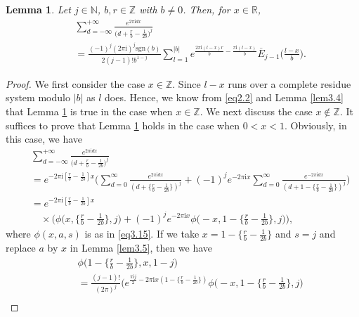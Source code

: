\documentclass[10pt,a4paper]{amsart}
\newtheorem{lemma}{Lemma}
\begin{document}
\begin{lemma}\label{lem3.6} Let $j\in\mathbb{N}$, $b,r\in\mathbb{Z}$ with $b\not=0$. Then, for $x\in\mathbb{R}$,
\begin{eqnarray}\label{eq3.16}
&&\sum_{d=-\infty}^{+\infty}\frac{e^{2\pi \mathrm{i}dx}}{\bigl(d+\frac{r}{b}-\frac{1}{2b}\bigl)^{j}}\nonumber\\
&&=\frac{(-1)^{j}(2\pi\mathrm{i})^{j}\mathrm{sgn}(b)}{2(j-1)!b^{1-j}}\sum_{l=1}^{|b|}e^{\frac{2\pi \mathrm{i}(l-x)r}{b}-\frac{\pi \mathrm{i}(l-x)}{b}}\overline{E}_{j-1}\biggl(\frac{l-x}{b}\biggl).
\end{eqnarray}
\end{lemma}

\begin{proof}
We first consider the case $x\in\mathbb{Z}$.
Since $l-x$ runs over a complete residue system modulo $|b|$ as
$l$ does. Hence, we know from \eqref{eq2.2} and Lemma \ref{lem3.4} that Lemma \ref{lem3.6} is true in the case when $x\in\mathbb{Z}$. We next discuss the case $x\not\in\mathbb{Z}$. It suffices to prove that Lemma \ref{lem3.6} holds in the case when $0<x<1$. Obviously, in this case, we have
\begin{eqnarray}\label{eq3.17}
&&\sum_{d=-\infty}^{+\infty}\frac{e^{2\pi \mathrm{i}dx}}{\bigl(d+\frac{r}{b}-\frac{1}{2b}\bigl)^{j}}\nonumber\\
&&=e^{-2\pi \mathrm{i}[\frac{r}{b}-\frac{1}{2b}]x}\biggl(\sum_{d=0}^{\infty}\frac{e^{2\pi \mathrm{i}dx}}{(d+\{\frac{r}{b}-\frac{1}{2b}\})^{j}}+(-1)^{j}e^{-2\pi \mathrm{i}x}\sum_{d=0}^{\infty}\frac{e^{-2\pi \mathrm{i}dx}}{(d+1-\{\frac{r}{b}-\frac{1}{2b}\})^{j}}\biggl)\nonumber\\
&&=e^{-2\pi \mathrm{i}[\frac{r}{b}-\frac{1}{2b}]x}\nonumber\\
&&\quad\times\biggl(\phi\biggl(x,\biggl\{\frac{r}{b}-\frac{1}{2b}\biggl\},j\biggl)
+(-1)^{j}e^{-2\pi \mathrm{i}x}\phi\biggl(-x,1-\biggl\{\frac{r}{b}-\frac{1}{2b}\biggl\},j\biggl)\biggl),
\end{eqnarray}
where $\phi(x,a,s)$ is as in \eqref{eq3.15}.
If we take $x=1-\{\frac{r}{b}-\frac{1}{2b}\}$ and $s=j$ and replace $a$ by $x$ in Lemma \ref{lem3.5}, then we have
\begin{eqnarray}\label{eq3.18}
&&\phi\biggl(1-\biggl\{\frac{r}{b}-\frac{1}{2b}\biggl\},x,1-j\biggl)\nonumber\\
&&=\frac{(j-1)!}{(2\pi)^{j}}\biggl(e^{\frac{\pi \mathrm{i}j}{2}-2\pi\mathrm{i}x(1-\{\frac{r}{b}-\frac{1}{2b}\})}\phi\biggl(-x,1-\biggl\{\frac{r}{b}-\frac{1}{2b}\biggl\},j\biggl)\nonumber\\

\end{eqnarray}
\end{proof}
\end{document}

